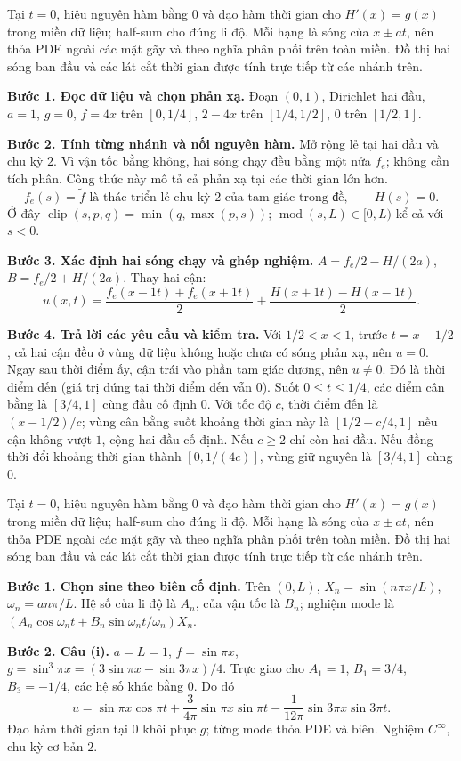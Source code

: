 Tại $t=0$, hiệu nguyên hàm bằng $0$ và đạo hàm thời gian cho $H'(x)=g(x)$ trong miền dữ liệu; half-sum cho đúng li độ. Mỗi hạng là sóng của $x\pm at$, nên thỏa PDE ngoài các mặt gãy và theo nghĩa phân phối trên toàn miền. Đồ thị hai sóng ban đầu và các lát cắt thời gian được tính trực tiếp từ các nhánh trên.

\textbf{Bước 1. Đọc dữ liệu và chọn phản xạ.} Đoạn $(0,1)$, Dirichlet hai đầu, $a=1$, $g=0$, $f=4x$ trên $[0,1/4]$, $2-4x$ trên $[1/4,1/2]$, $0$ trên $[1/2,1]$.

\textbf{Bước 2. Tính từng nhánh và nối nguyên hàm.} Mở rộng lẻ tại hai đầu và chu kỳ $2$. Vì vận tốc bằng không, hai sóng chạy đều bằng một nửa $f_e$; không cần tích phân. Công thức này mô tả cả phản xạ tại các thời gian lớn hơn.
\[f_e(s)=\widetilde f\text{ là thác triển lẻ chu kỳ }2\text{ của tam giác trong đề},\qquad H(s)=0.\]
Ở đây $\operatorname{clip}(s,p,q)=\min(q,\max(p,s))$; $\operatorname{mod}(s,L)\in[0,L)$ kể cả với $s<0$.

\textbf{Bước 3. Xác định hai sóng chạy và ghép nghiệm.} $A=f_e/2-H/(2a)$, $B=f_e/2+H/(2a)$. Thay hai cận:
\[u(x,t)=\frac{f_e(x-1t)+f_e(x+1t)}2+\frac{H(x+1t)-H(x-1t)}{2}.\]

\textbf{Bước 4. Trả lời các yêu cầu và kiểm tra.} Với $1/2<x<1$, trước $t=x-1/2$, cả hai cận đều ở vùng dữ liệu không hoặc chưa có sóng phản xạ, nên $u=0$. Ngay sau thời điểm ấy, cận trái vào phần tam giác dương, nên $u\ne0$. Đó là thời điểm đến (giá trị đúng tại thời điểm đến vẫn $0$). Suốt $0\le t\le1/4$, các điểm cân bằng là $[3/4,1]$ cùng đầu cố định $0$. Với tốc độ $c$, thời điểm đến là $(x-1/2)/c$; vùng cân bằng suốt khoảng thời gian này là $[1/2+c/4,1]$ nếu cận không vượt $1$, cộng hai đầu cố định. Nếu $c\ge2$ chỉ còn hai đầu. Nếu đồng thời đổi khoảng thời gian thành $[0,1/(4c)]$, vùng giữ nguyên là $[3/4,1]$ cùng $0$.

Tại $t=0$, hiệu nguyên hàm bằng $0$ và đạo hàm thời gian cho $H'(x)=g(x)$ trong miền dữ liệu; half-sum cho đúng li độ. Mỗi hạng là sóng của $x\pm at$, nên thỏa PDE ngoài các mặt gãy và theo nghĩa phân phối trên toàn miền. Đồ thị hai sóng ban đầu và các lát cắt thời gian được tính trực tiếp từ các nhánh trên.

\textbf{Bước 1. Chọn sine theo biên cố định.} Trên $(0,L)$, $X_n=\sin(n\pi x/L)$, $\omega_n=an\pi/L$. Hệ số của li độ là $A_n$, của vận tốc là $B_n$; nghiệm mode là $(A_n\cos\omega_nt+B_n\sin\omega_nt/\omega_n)X_n$.

\textbf{Bước 2. Câu (i).} $a=L=1$, $f=\sin\pi x$, $g=\sin^3\pi x=(3\sin\pi x-\sin3\pi x)/4$. Trực giao cho $A_1=1$, $B_1=3/4$, $B_3=-1/4$, các hệ số khác bằng $0$. Do đó
\[u=\sin\pi x\cos\pi t+\frac3{4\pi}\sin\pi x\sin\pi t-\frac1{12\pi}\sin3\pi x\sin3\pi t.\]
Đạo hàm thời gian tại $0$ khôi phục $g$; từng mode thỏa PDE và biên. Nghiệm $C^\infty$, chu kỳ cơ bản $2$.

